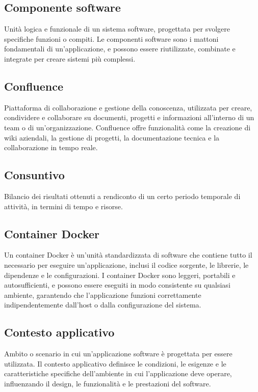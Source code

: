 \hypertarget{sec:componente software}{}
\subsection*{Componente software}
Unità logica e funzionale di un sistema software, progettata per svolgere specifiche funzioni o compiti. Le componenti software sono i mattoni
fondamentali di un'applicazione, e possono essere riutilizzate, combinate e integrate per creare sistemi più complessi.

\hypertarget{sec:confluence}{}
\subsection*{Confluence}
Piattaforma di collaborazione e gestione della conoscenza, utilizzata per creare, condividere e collaborare su documenti, progetti e informazioni all'interno 
di un team o di un'organizzazione. Confluence offre funzionalità come la creazione di wiki aziendali, la gestione di progetti, la documentazione tecnica e la 
collaborazione in tempo reale.

\hypertarget{sec:consuntivo}{}
\subsection*{Consuntivo}
Bilancio dei risultati ottenuti a rendiconto di un certo periodo temporale di attività, in termini di tempo e risorse.

\hypertarget{sec:container_docker}{}
\subsection*{Container Docker}
Un container Docker è un'unità standardizzata di software che contiene tutto il necessario per eseguire un'applicazione, inclusi il codice sorgente,
le librerie, le dipendenze e le configurazioni. I container Docker sono leggeri, portabili e autosufficienti, e possono essere eseguiti in modo
consistente su qualsiasi ambiente, garantendo che l'applicazione funzioni correttamente indipendentemente dall'host o dalla configurazione del sistema.

\hypertarget{sec:contesto_applicativo}{}
\subsection*{Contesto applicativo}
Ambito o scenario in cui un'applicazione software è progettata per essere utilizzata. Il contesto applicativo definisce le condizioni, le esigenze e le
caratteristiche specifiche dell'ambiente in cui l'applicazione deve operare, influenzando il design, le funzionalità e le prestazioni del software.

